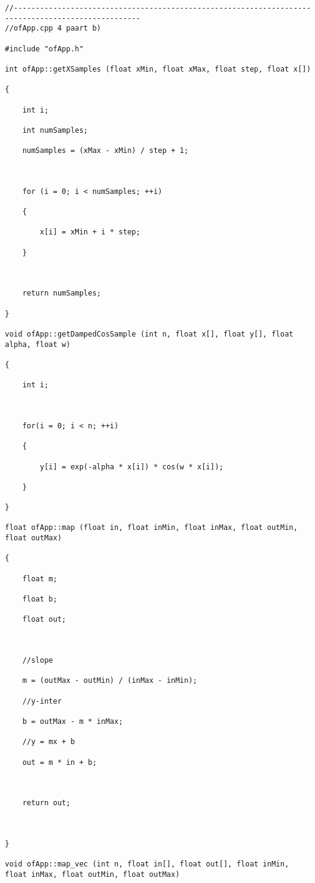 \documentclass[letterpaper, 24pt, final, onecolumn, titlepage] {article}
\begin{document}
\begin{lstlisting}
//---------------------------------------------------------------------------------------------------
//ofApp.cpp 4 paart b)

#include "ofApp.h"

int ofApp::getXSamples (float xMin, float xMax, float step, float x[])

{

    int i;

    int numSamples;

    numSamples = (xMax - xMin) / step + 1;



    for (i = 0; i < numSamples; ++i)

    {

        x[i] = xMin + i * step;

    }



    return numSamples;

}

void ofApp::getDampedCosSample (int n, float x[], float y[], float alpha, float w)

{

    int i;



    for(i = 0; i < n; ++i)

    {

        y[i] = exp(-alpha * x[i]) * cos(w * x[i]);

    }

}

float ofApp::map (float in, float inMin, float inMax, float outMin, float outMax)

{

    float m;

    float b;

    float out;



    //slope

    m = (outMax - outMin) / (inMax - inMin);

    //y-inter

    b = outMax - m * inMax;

    //y = mx + b

    out = m * in + b;



    return out;



}

void ofApp::map_vec (int n, float in[], float out[], float inMin, float inMax, float outMin, float outMax)


\end{lstlisting}
\end{document}
